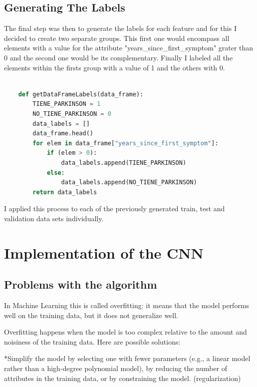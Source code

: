 \documentclass[12pt, a4paper]{article}
\begin{document}
	\clearpage
	
	\subsection{Generating The Labels}
	
	The final step was then to generate the labels for each feature and for this I decided to create two separate groups. This first one would encompass all elements with a value for the attribute "years\_since\_first\_symptom" grater than 0 and the second one  would be its complementary. Finally I labeled all the elements within the firsts group with a value of 1 and the others with 0. 
	
	\vspace{5mm}
	
	\begin{lstlisting}[language=Python]
		
	def getDataFrameLabels(data_frame):
		TIENE_PARKINSON = 1
		NO_TIENE_PARKINSON = 0
		data_labels = []
		data_frame.head()
		for elem in data_frame["years_since_first_symptom"]:
			if (elem > 0):
				data_labels.append(TIENE_PARKINSON)
			else:
				data_labels.append(NO_TIENE_PARKINSON)
		return data_labels
	\end{lstlisting}
	
	I applied this process to each of the previously generated train, test and validation data sets individually. 
	
	\clearpage
	
	\section{Implementation of the CNN}
	\label{sec:CNNImplementation}
	
	\clearpage
	
	\subsection{Problems with the algorithm}
	\label{sec:ProblemsWithAlgorithm}
	
	In Machine Learning this is called overfitting: it means that the model performs well on the training data, but it does not generalize well.
	
	Overfitting happens when the model is too complex relative to the amount and noisiness of the training data. Here are possible solutions:
	
	*Simplify the model by selecting one with fewer parameters (e.g., a linear model rather than a high-degree polynomial model), by reducing the number of attributes in the training data, or by constraining the model. (regularization)
	
\end{document}
